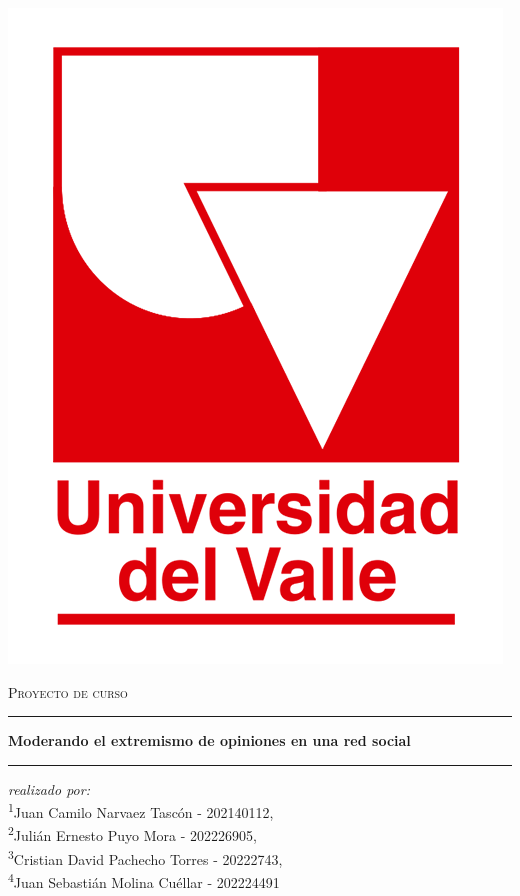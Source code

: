 \documentclass[letterpaper,10pt]{article}
\begin{document}
\begin{titlepage}
    \begin{center}
    
    
    \includegraphics[scale=0.35]{Images/RojoTransparenteUV.png} \vspace{0.5cm}
    
    \textsc{\Large Proyecto de curso } \vspace{0.5cm} %
    
    
    \rule{14cm}{0.05cm} \vspace{0.4cm} %
    
    
    \Large{\textbf{   Moderando el extremismo de opiniones en una red social  }}\vspace{0.4cm} %
    
    \rule{14cm}{0.05cm} \vspace{1.5cm} %
     
    \large{\textit{realizado por:}} \\
    \Large{{\color{crtitle} 
    \textsuperscript{1}Juan Camilo Narvaez Tascón - 202140112, \\
    \textsuperscript{2}Julián Ernesto Puyo Mora - 202226905,\\
    \textsuperscript{3}Cristian David Pachecho Torres - 20222743,\\
    \textsuperscript{4}Juan Sebastián Molina Cuéllar - 202224491}
    }  %
    

\end{center}
\end{titlepage}
\end{document}
